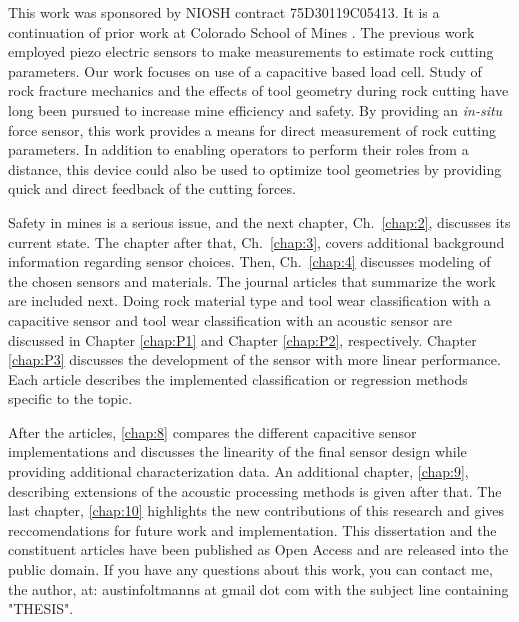 This work was sponsored by NIOSH contract 75D30119C05413.
It is a continuation of prior work at Colorado School of Mines \cite{11124/170545}.
The previous work employed piezo electric sensors to make measurements to estimate
rock cutting parameters. 
Our work focuses on use of a capacitive based load cell.
Study of rock fracture mechanics \cite{11124/14359} 
and the effects of tool geometry during rock cutting \cite{11124/13192, 11124/16423, 11124/176345} 
have long been pursued to increase mine efficiency and safety.
By providing an \textit{in-situ} force sensor, this work provides a means
for direct measurement of rock cutting parameters.
In addition to enabling operators to perform their roles from a distance,
this device could also be used to optimize tool geometries 
by providing quick and direct feedback of the cutting forces.

Safety in mines is a serious issue, and the next chapter, Ch.~\ref{chap:2}, discusses its current state.
The chapter after that, Ch.~\ref{chap:3}, covers additional background information regarding sensor choices.
Then, Ch.~\ref{chap:4} discusses modeling of the chosen sensors and materials.
The journal articles that summarize the work are included next. 
Doing rock material type and tool wear classification with a capacitive sensor and 
tool wear classification with an acoustic sensor
are discussed in Chapter \ref{chap:P1} and Chapter \ref{chap:P2}, respectively.
Chapter \ref{chap:P3} discusses the development of the sensor with more linear performance.
Each article describes the implemented classification or regression methods specific to the topic.

After the articles, \ref{chap:8} compares the different capacitive sensor implementations
and discusses the linearity of the final sensor design while providing additional characterization data.
An additional chapter, \ref{chap:9}, describing extensions of the acoustic processing methods is given after that.
The last chapter, \ref{chap:10} highlights the new contributions of this research and gives reccomendations 
for future work and implementation.
This dissertation and the constituent articles have been published as 
Open Access and are released into the public domain.
If you have any questions about this work, you can contact me, the author, at:
austinfoltmanns at gmail dot com with the subject line containing "THESIS".

